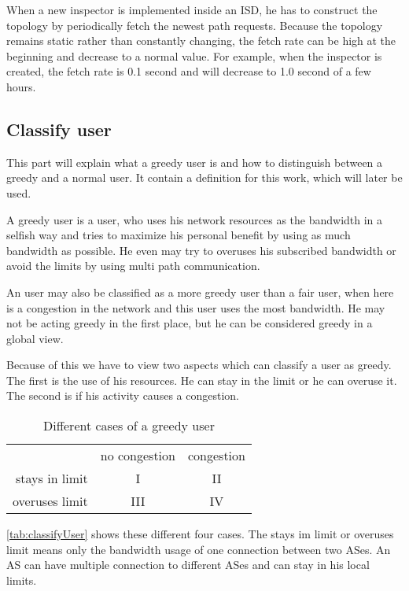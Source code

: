 \documentclass[thesis.tex]{subfiles}
\begin{document}
When a new inspector is implemented inside an ISD, he has to construct the topology by periodically fetch the newest path requests. Because the topology remains static rather than constantly changing, the fetch rate can be high at the beginning and decrease to a normal value. For example, when the inspector is created, the fetch rate is 0.1 second and will decrease to 1.0 second of a few hours. 


\subsection{Classify user}
This part will explain what a greedy user is and how to distinguish between a greedy and a normal user. It contain a definition for this work, which will later be used.

A greedy user is a user, who uses his network resources as the bandwidth in a selfish way and tries to maximize his personal benefit by using as much bandwidth as possible. He even may try to overuses his subscribed bandwidth or avoid the limits by using multi path communication.

An user may also be classified as a more greedy user than a fair user, when here is a congestion in the network and this user uses the most bandwidth. He may not be acting greedy in the first place, but he can be considered greedy in a global view.

Because of this we have to view two aspects which can classify a user as greedy. The first is the use of his resources. He can stay in the limit or he can overuse it. The second is if his activity causes a congestion.
\begin{table}[h]
    \centering
    \begin{tabular}{ r|c|c| }
        \multicolumn{1}{r}{}
        &  \multicolumn{1}{c}{no congestion}
        & \multicolumn{1}{c}{congestion} \\
        \cline{2-3}
        stays in limit & I & II \\
        \cline{2-3}
        overuses limit & III & IV \\
        \cline{2-3}
    \end{tabular}
    \caption{Different cases of a greedy user}
    \label{tab:classifyUser}    
\end{table}

\autoref{tab:classifyUser} shows these different four cases. The stays im limit or overuses limit means only the bandwidth usage of one connection between two ASes. An AS can have multiple connection to different ASes and can stay in his local limits.
\end{document}
